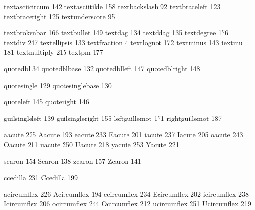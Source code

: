  textasciicircum  142
 textasciitilde   158
 textbackslash     92
 textbraceleft    123
 textbraceright   125
 textunderscore    95

 textbrokenbar    166
 textbullet       149
 textdag          134
 textddag         135
 textdegree       176
 textdiv          247
 textellipsis     133
 textfraction       4
 textlognot       172
 textminus        143
 textmu           181
 textmultiply     215
 textpm           177

 quotedbl          34
 quotedblbase     132
 quotedblleft     147
 quotedblright    148

 quotesingle      129
 quotesinglebase  130

 quoteleft        145
 quoteright       146

 guilsingleleft   139
 guilsingleright  155
 leftguillemot    171
 rightguillemot   187

 aacute           225
 Aacute           193
 eacute           233
 Eacute           201
 iacute           237
 Iacute           205
 oacute           243
 Oacute           211
 uacute           250
 Uacute           218
 yacute           253
 Yacute           221

 scaron           154
 Scaron           138
 zcaron           157
 Zcaron           141

 ccedilla         231
 Ccedilla         199

 acircumflex      226
 Acircumflex      194
 ecircumflex      234
 Ecircumflex      202
 icircumflex      238
 Icircumflex      206
 ocircumflex      244
 Ocircumflex      212
 ucircumflex      251
 Ucircumflex      219

